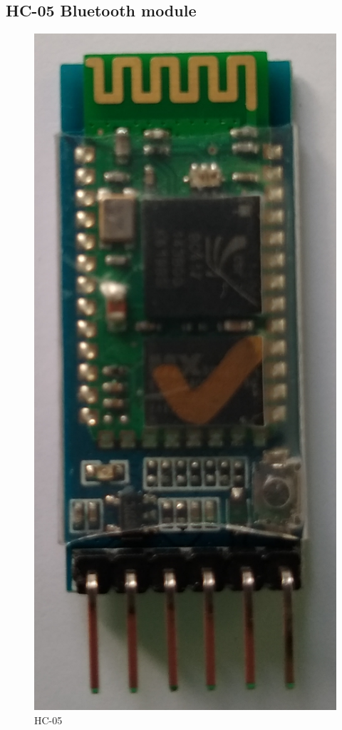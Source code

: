 \documentclass[12pt,a4paper]{article}
\begin{document}
		\subsection{HC-05 Bluetooth module}
		
		\begin{figure}
			\centering
			\includegraphics[scale=0.06]{hc-05_1.jpg}
			\caption[HC-05 Bluetooth module]{HC-05}
		\end{figure}
\end{document}
